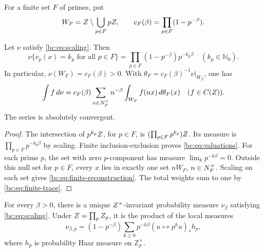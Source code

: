 For a finite set \(F\) of primes, put
\[
 W_F=Z\setminus\bigcup_{p\in F}pZ,
 \qquad c_F(\beta)=\prod_{p\in F}(1-p^{-\beta}).
\]

\begin{lemma}\label{bc:lem:finite}
Let \(\nu\) satisfy \eqref{bc:eq:scaling}. Then
\begin{equation}\label{bc:eq:valuations}
 \nu\{v_p(x)=k_p\text{ for all }p\in F\}
  =\prod_{p\in F}(1-p^{-\beta})p^{-k_p\beta}
   \quad(k_p\in\mathbb N_0).
\end{equation}
In particular, \(\nu(W_F)=c_F(\beta)>0\).
With \(\theta_F=c_F(\beta)^{-1}\nu|_{W_F}\), one has
\begin{equation}\label{bc:eq:finite-reconstruction}
 \int f\,d\nu=c_F(\beta)
   \sum_{n\in N^{\times}_F}n^{-\beta}\int_{W_F}f(nx)\,d\theta_F(x)
   \quad(f\in C(Z)).
\end{equation}
The series is absolutely convergent.
\end{lemma}

\begin{proof}
The intersection of \(p^{k_p}Z\), for \(p\in F\), is
\((\prod_{p\in F}p^{k_p})Z\). Its measure is
\(\prod_{p\in F}p^{-k_p\beta}\) by scaling.
Finite inclusion-exclusion proves \eqref{bc:eq:valuations}.
For each prime \(p\), the set with zero \(p\)-component has measure
\(\lim_kp^{-k\beta}=0\). Outside this null set for \(p\in F\),
every \(x\) lies in exactly one set \(nW_F\), \(n\in N^{\times}_F\).
Scaling on each set gives \eqref{bc:eq:finite-reconstruction}.
The total weights sum to one by \eqref{bc:eq:finite-trace}.
\end{proof}

\begin{proposition}\label{bc:prop:radial}
For every \(\beta>0\), there is a unique \(Z^{\times}\)-invariant
probability measure \(\nu_\beta\) satisfying \eqref{bc:eq:scaling}.
Under \(Z=\prod_pZ_p\), it is the product of the local measures
\begin{equation}\label{bc:eq:radial}
 \nu_{\beta,p}=(1-p^{-\beta})
       \sum_{k\geq0}p^{-k\beta}(u\mapsto p^ku)_*h_p,
\end{equation}
where \(h_p\) is probability Haar measure on \(\mathbb Z_p^\times\).
\end{proposition}

